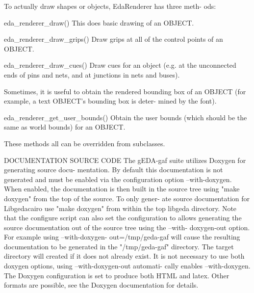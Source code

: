               To actually draw shapes or objects, EdaRenderer has three  meth-
              ods:

                eda_renderer_draw()
                    This does basic drawing of an OBJECT.

                eda_renderer_draw_grips()
                    Draw grips at all of the control points of an OBJECT.

                eda_renderer_draw_cues()
                    Draw  cues  for an object (e.g. at the unconnected ends of
              pins and
                    nets, and at junctions in nets and buses).

              Sometimes, it is useful to obtain the rendered bounding  box  of
              an  OBJECT  (for example, a text OBJECT's bounding box is deter-
              mined by the font).

                eda_renderer_get_user_bounds()
                    Obtain the user bounds (which should be the same as world
                    bounds) for an OBJECT.

              These methods all can be overridden from subclasses.

DOCUMENTATION
          SOURCE CODE
              The gEDA-gaf suite utilizes Doxygen for generating source  docu-
              mentation.  By  default  this documentation is not generated and
              must be enabled via  the  configuration  option  --with-doxygen.
              When enabled, the documentation is then built in the source tree
              using "make doxygen" from the top of the source. To only  gener-
              ate  source  documentation  for  Libgedacairo use "make doxygen"
              from within the top libgeda directory. Note that  the  configure
              script  can  also set the configuration to allows generating the
              source documentation out of the source tree  using  the  --with-
              doxygen-out    option.   For   example   using   --with-doxygen-
              out=/tmp/geda-gaf will cause the resulting documentation  to  be
              generated in the "/tmp/geda-gaf" directory. The target directory
              will created if it does not already exist. It is  not  necessary
              to  use both doxygen options, using --with-doxygen-out automati-
              cally enables --with-doxygen.  The Doxygen configuration is  set
              to  produce both HTML and latex. Other formats are possible, see
              the Doxygen documentation for details.

